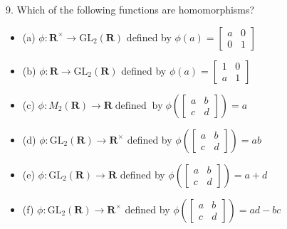\begin{mdframed}[style=darkAnswer,frametitle={Joe Starr}]
  9. Which of the following functions are homomorphisms?
\begin{itemize}
\item[]{(a) $\phi: \mathbf{R}^{\times} \rightarrow \mathrm{GL}_{2}(\mathbf{R})$ defined by $\phi(a)=\left[\begin{array}{ll}a & 0 \\ 0 & 1\end{array}\right]$}
\item[]{(b) $\phi: \mathbf{R} \rightarrow \mathrm{GL}_{2}(\mathbf{R})$ defined by $\phi(a)=\left[\begin{array}{ll}1 & 0 \\ a & 1\end{array}\right]$}
\item[]{(c) $\phi: M_{2}(\mathbf{R}) \rightarrow \mathbf{R} \operatorname{defined} \operatorname{by} \phi\left(\left[\begin{array}{ll}a & b \\ c & d\end{array}\right]\right)=a$}
\item[]{(d) $\phi: \mathrm{GL}_{2}(\mathbf{R}) \rightarrow \mathbf{R}^{\times}$ defined by $\phi\left(\left[\begin{array}{ll}a & b \\ c & d\end{array}\right]\right)=a b$}
\item[]{(e) $\phi: \mathrm{GL}_{2}(\mathbf{R}) \rightarrow \mathbf{R}$ defined by $\phi\left(\left[\begin{array}{ll}a & b \\ c & d\end{array}\right]\right)=a+d$}
\item[]{(f) $\phi: \mathrm{GL}_{2}(\mathbf{R}) \rightarrow \mathbf{R}^{\times}$ defined by $\phi\left(\left[\begin{array}{ll}a & b \\ c & d\end{array}\right]\right)=a d-b c$}
\end{itemize}
\end{mdframed}
\newpage

